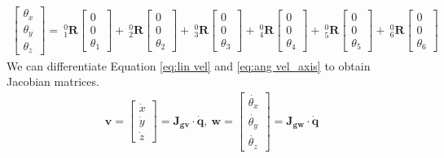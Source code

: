 \begin{equation}
\begin{split}
\begin{bmatrix}
\theta _x \\
\theta _y \\
\theta _z 
\end{bmatrix}
=
\ ^0_1\mathbf{R}
\begin{bmatrix}
0 \\ 
0 \\ 
\theta _1
\end{bmatrix}
+
\ ^0_2\mathbf{R}
\begin{bmatrix}
0 \\ 
0 \\ 
\theta _2
\end{bmatrix}
+
\ ^0_3\mathbf{R}
\begin{bmatrix}
0 \\ 
0 \\ 
\theta _3
\end{bmatrix}
+
\ ^0_4\mathbf{R}
\begin{bmatrix}
0 \\ 
0 \\ 
\theta _4
\end{bmatrix}
+
\ ^0_5\mathbf{R}
\begin{bmatrix}
0 \\ 
0 \\ 
\theta _5
\end{bmatrix}
+
\ ^0_6\mathbf{R}
\begin{bmatrix}
0 \\ 
0 \\ 
\theta _6
\end{bmatrix}
\end{split}
\end{equation}\label{eq:ang vel_axis}
We can differentiate Equation \ref{eq:lin vel} and \ref{eq:ang vel_axis} to obtain Jacobian matrices.
\begin{equation}
\begin{split}
\boldsymbol{v} 
= 
\begin{bmatrix}
\dot{x}\\
\dot{y}\\
\dot{z}
\end{bmatrix}
=
\mathbf{J_{gv}} \cdot \boldsymbol{\dot{q}}
,\ 
\boldsymbol{w} 
= 
\begin{bmatrix}
\dot{\theta _x}\\
\dot{\theta _y}\\
\dot{\theta _z}
\end{bmatrix}
=
\mathbf{J_{gw}} \cdot \boldsymbol{\dot{q}}
\end{split}
\end{equation}
